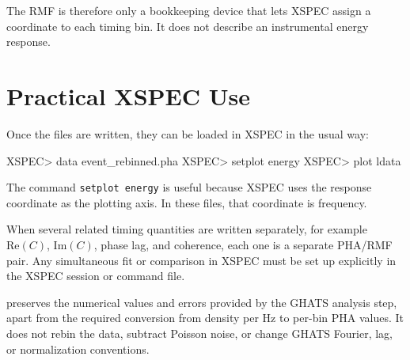 The RMF is therefore only a bookkeeping device that lets XSPEC assign a
coordinate to each timing bin.  It does not describe an instrumental energy
response.

\section{Practical XSPEC Use}

Once the files are written, they can be loaded in XSPEC in the usual way:

\begin{ghatsconsole}
XSPEC> data event_rebinned.pha
XSPEC> setplot energy
XSPEC> plot ldata
\end{ghatsconsole}

The command \texttt{setplot energy} is useful because XSPEC uses the response
coordinate as the plotting axis.  In these files, that coordinate is frequency.

When several related timing quantities are written separately, for example
\(\mathrm{Re}(C)\), \(\mathrm{Im}(C)\), phase lag, and coherence, each one is a
separate PHA/RMF pair.  Any simultaneous fit or comparison in XSPEC must be
set up explicitly in the XSPEC session or command file.

\begin{ghatsnote}
 preserves the numerical values and errors provided by the
GHATS analysis step, apart from the required conversion from density per Hz to
per-bin PHA values.  It does not rebin the data, subtract Poisson noise, or
change GHATS Fourier, lag, or normalization conventions.
\end{ghatsnote}
